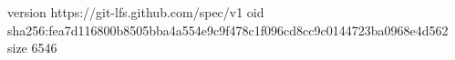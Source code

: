 version https://git-lfs.github.com/spec/v1
oid sha256:fea7d116800b8505bba4a554e9c9f478c1f096cd8cc9c0144723ba0968e4d562
size 6546
